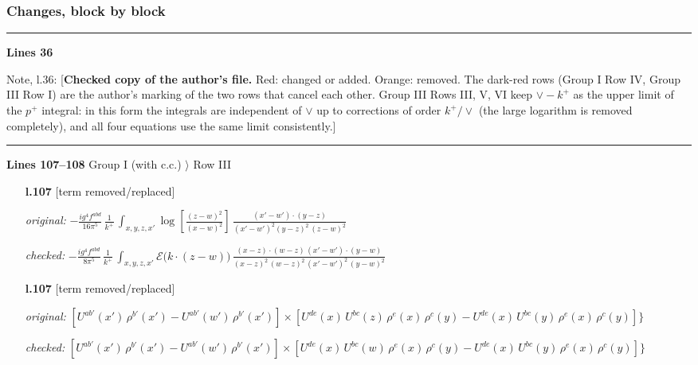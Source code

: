 \documentclass[10pt]{article}
\newenvironment{notebox}{\def\FrameCommand{{\color{notebar}\vrule width 1.5pt}\hspace{6pt}}\MakeFramed{\advance\hsize-\width\FrameRestore}\small}{\endMakeFramed}
\begin{document}
\subsubsection*{Changes, block by block}
\noindent\rule{\linewidth}{0.3pt}\par\noindent\textbf{Lines 36}\par
\begin{notebox}\textsf{\small Note, l.36:} [\textbf{Checked copy of the author's file.} Red: changed or added. Orange: removed. The dark-red rows (Group I Row IV, Group III Row I) are the author's marking of the two rows that cancel each other. Group III Rows III, V, VI keep $\vee-k^{+}$ as the upper limit of the $p^{+}$ integral: in this form the integrals are independent of $\vee$ up to corrections of order $k^{+}/\vee$ (the large logarithm is removed completely), and all four equations use the same limit consistently.]\end{notebox}
\noindent\rule{\linewidth}{0.3pt}\par\noindent\textbf{Lines 107--108} \quad \textsf{Group I (with c.c.) $\rangle$ Row III} \par
\begin{itemize}[leftmargin=2.2em,itemsep=1pt,topsep=2pt]
\item[\textbf{l.107}] \textsf{\small [term removed/replaced]} \par\noindent\emph{original:} $\displaystyle -\frac{ig^{4}f^{abd}}{16\pi^{5}}\,\frac{1}{k^{+}}\,\int_{x,y,z,x'}\log{[\frac{(z-w)^{2}}{(x-w)^{2}}]}\,\frac{(x'-w')\cdot(y-z)}{(x'-w')^{2}(y-z)^{2}\,(z-w)^{2}}$\par\noindent\emph{checked:} $\displaystyle -\frac{ig^{4}f^{abd}}{8\pi^{5}}\,\frac{1}{k^{+}}\,\int_{x,y,z,x'}\mathcal{E}\big(k\cdot(z-w)\big)\,\frac{(x-z)\cdot(w-z)\,(x'-w')\cdot(y-w)}{(x-z)^{2}\,(w-z)^{2}\,(x'-w')^{2}\,(y-w)^{2}}$
\item[\textbf{l.107}] \textsf{\small [term removed/replaced]} \par\noindent\emph{original:} $\displaystyle [U^{ab'}(x')\,\rho^{b'}(x')-U^{ab'}(w')\, \rho^{b'}(x')]\times [U^{de}(x)\,U^{bc}(z)\, \rho^{e}(x)\,\rho^{c}(y)-U^{de}(x)\,U^{bc}(y)\,\rho^{e}(x)\,\rho^{c}(y)]\Bigg\}$\par\noindent\emph{checked:} $\displaystyle [U^{ab'}(x')\,\rho^{b'}(x')-U^{ab'}(w')\, \rho^{b'}(x')]\times [U^{de}(x)\,U^{bc}(w)\, \rho^{e}(x)\,\rho^{c}(y)-U^{de}(x)\,U^{bc}(y)\,\rho^{e}(x)\,\rho^{c}(y)]\Bigg\}$
\end{itemize}
\end{document}
